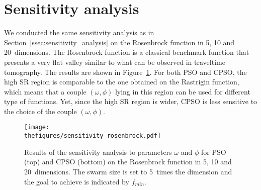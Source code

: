 \def\thefigures{app_sensana/figures}


\section{Sensitivity analysis}
\label{app:sensitivity_analysis}

We conducted the same sensitivity analysis as in Section~\ref{ssec:sensitivity_analysis} on the Rosenbrock function in 5, 10 and 20~dimensions. The Rosenbrock function is a classical benchmark function that presents a very flat valley similar to what can be observed in traveltime tomography. The results are shown in Figure~\ref{fig:sensana_rosenbrock}. For both PSO and CPSO, the high SR region is comparable to the one obtained on the Rastrigin function, which means that a couple $\left( \omega, \phi \right)$ lying in this region can be used for different type of functions. Yet, since the high SR region is wider, CPSO is less sensitive to the choice of the couple $\left( \omega, \phi \right)$.

\begin{figure}[!htbp]
	\centering
	\texttt{[image: \\thefigures/sensitivity\_rosenbrock.pdf]}
    \caption{Results of the sensitivity analysis to parameters $\omega$ and $\phi$ for PSO (top) and CPSO (bottom) on the Rosenbrock function in 5, 10 and 20~dimensions. The swarm size is set to 5~times the dimension and the goal to achieve is indicated by $f_{min}$.}
    \label{fig:sensana_rosenbrock}
\end{figure}
